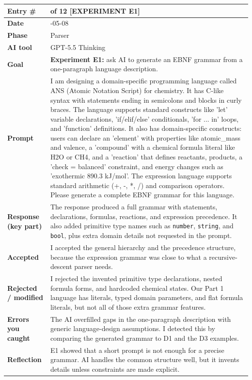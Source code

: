 \documentclass[11pt,a4paper]{article}
\newcommand{\code}[1]{\texttt{#1}}
\newcommand{\entrygap}{\vspace{8pt}}
\newenvironment{journalentry}{%
  \begin{center}\small\renewcommand{\arraystretch}{1.22}%
  \begin{tabular}{|>{\columncolor{anscodebg}\bfseries}p{3.0cm}|>{\RaggedRight\arraybackslash}p{12.25cm}|}%
  \hline
}{%
  \end{tabular}\end{center}\entrygap
}
\begin{document}
\begin{journalentry}
Entry \# & 11 of 12 [EXPERIMENT E1] \\ \hline
Date & 2026-05-08 \\ \hline
Phase & Parser \\ \hline
AI tool & GPT-5.5 Thinking \\ \hline
Goal & \textbf{Experiment E1:} ask AI to generate an EBNF grammar from a one-paragraph language description. \\ \hline
Prompt & I am designing a domain-specific programming language called ANS (Atomic Notation Script) for chemistry. It has C-like syntax with statements ending in semicolons and blocks in curly braces. The language supports standard constructs like 'let' variable declarations, 'if/elif/else' conditionals, 'for ... in' loops, and 'function' definitions. It also has domain-specific constructs: users can declare an 'element' with properties like atomic\_mass and valence, a 'compound' with a chemical formula literal like H2O or CH4, and a 'reaction' that defines reactants, products, a 'check = balanced' constraint, and energy changes such as 'exothermic 890.3 kJ/mol'. The expression language supports standard arithmetic (+, -, *, /) and comparison operators. Please generate a complete EBNF grammar for this language. \\ \hline
Response (key part) & The response produced a full grammar with statements, declarations, formulas, reactions, and expression precedence. It also added primitive type names such as \code{number}, \code{string}, and \code{bool}, plus extra domain details not requested in the prompt. \\ \hline
Accepted & I accepted the general hierarchy and the precedence structure, because the expression grammar was close to what a recursive-descent parser needs. \\ \hline
Rejected / modified & I rejected the invented primitive type declarations, nested formula forms, and hardcoded chemical states. Our Part 1 language has literals, typed domain parameters, and flat formula literals, but not all of those extra grammar features. \\ \hline
Errors you caught & The AI overfilled gaps in the one-paragraph description with generic language-design assumptions. I detected this by comparing the generated grammar to D1 and the D3 examples. \\ \hline
Reflection & E1 showed that a short prompt is not enough for a precise grammar. AI handles the common structure well, but it invents details unless constraints are made explicit. \\ \hline
\end{journalentry}
\end{document}
